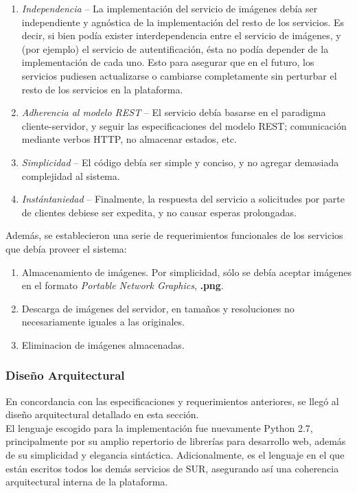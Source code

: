 \documentclass[11pt,letterpaper]{article}
\begin{document}
\begin{enumerate}
    \item \emph{Independencia} -- \@ La implementación del servicio de imágenes debía ser independiente y agnóstica de la implementación del resto de los servicios. Es decir, si bien podía exister interdependencia entre el servicio de imágenes, y (por ejemplo) el servicio de autentificación, ésta no podía depender de la implementación de cada uno. Esto para asegurar que en el futuro, los servicios pudiesen actualizarse o cambiarse completamente sin perturbar el resto de los servicios en la plataforma.
    \item \emph{Adherencia al modelo REST} -- \@ El servicio debía basarse en el paradigma cliente-servidor, y seguir las especificaciones del modelo REST; comunicación mediante verbos HTTP, no almacenar estados, etc.
    \item \emph{Simplicidad} -- \@ El código debía ser simple y conciso, y no agregar demasiada complejidad al sistema.
    \item \emph{Instántaniedad} -- \@ Finalmente, la respuesta del servicio a solicitudes por parte de clientes debiese ser expedita, y no causar esperas prolongadas.
\end{enumerate}

Además, se establecieron una serie de requerimientos funcionales de los servicios que debía proveer el sistema:
\begin{enumerate}
    \item Almacenamiento de imágenes. Por simplicidad, sólo se debía aceptar imágenes en el formato \emph{Portable Network Graphics}, \textbf{.png}.
    \item Descarga de imágenes del servidor, en tamaños y resoluciones no necesariamente iguales a las originales.
    \item Eliminacion de imágenes almacenadas.
\end{enumerate}
\newpage
\subsubsection{Diseño Arquitectural}

En concordancia con las especificaciones y requerimientos anteriores, se llegó al diseño arquitectural detallado en esta sección.\\

El lenguaje escogido para la implementación fue nuevamente Python 2.7, principalmente por su amplio repertorio de librerías para desarrollo web, además de su simplicidad y elegancia sintáctica. Adicionalmente, es el lenguaje en el que están escritos todos los demás servicios de SUR, asegurando así una coherencia arquitectural interna de la plataforma.\\
\end{document}
